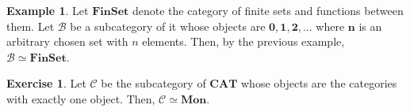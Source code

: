 \documentclass{article}
\theoremstyle{definition}
\newtheorem{example}[theorem]{Example}
\newtheorem{exercise}[theorem]{Exercise}
\newcommand{\cat}[1]{\mathscr{#1}}
\begin{document}
\begin{example}
    Let $\textbf{FinSet}$ denote the category of finite sets and functions between them. Let $\cat{B}$ be a subcategory of it whose objects are $\textbf{0}, \textbf{1}, \textbf{2}, \dots$ where $\textbf{n}$ is an arbitrary chosen set with $n$ elements. Then, by the previous example, $\cat{B} \simeq \textbf{FinSet}$.
\end{example}

\begin{exercise}
    Let $\cat{C}$ be the subcategory of $\textbf{CAT}$ whose objects are the categories with exactly one object. Then, $\cat{C} \simeq \textbf{Mon}$.
\end{exercise}

\end{document}

